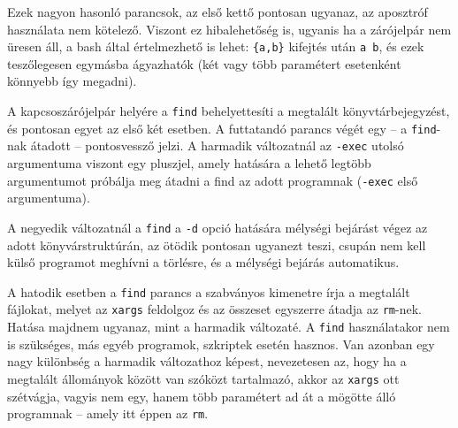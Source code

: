 Ezek nagyon hasonló parancsok, az első kettő pontosan ugyanaz, az aposztróf
használata nem kötelező. Viszont ez hibalehetőség is, ugyanis ha a zárójelpár
nem üresen áll, a bash által értelmezhető is lehet: \texttt{\{a,b\}} kifejtés
után \texttt{a b}, és ezek teszőlegesen egymásba ágyazhatók (két vagy több
paramétert esetenként könnyebb így megadni).

A kapcsoszárójelpár helyére a \texttt{find} behelyettesíti a megtalált
könyvtárbejegyzést, és pontosan egyet az első két esetben. A futtatandó parancs
végét egy -- a \texttt{find}-nak átadott -- pontosvessző jelzi. A harmadik
változatnál az \texttt{-exec} utolsó argumentuma viszont egy pluszjel, amely
hatására a lehető legtöbb argumentumot próbálja meg átadni a find az adott
programnak (\texttt{-exec} első argumentuma).

A negyedik változatnál a \texttt{find} a \texttt{-d} opció hatására mélységi
bejárást végez az adott könyvárstruktúrán, az ötödik pontosan ugyanezt teszi,
csupán nem kell külső programot meghívni a törlésre, és a mélységi bejárás
automatikus.

A hatodik esetben a \texttt{find} parancs a szabványos kimenetre írja a
megtalált fájlokat, melyet az \texttt{xargs} feldolgoz és az összeset egyszerre
átadja az \texttt{rm}-nek. Hatása majdnem ugyanaz, mint a harmadik változaté. A
\texttt{find} használatakor nem is szükséges, más egyéb programok, szkriptek
esetén hasznos. Van azonban egy nagy különbség a harmadik változathoz képest,
nevezetesen az, hogy ha a megtalált állományok között van szóközt tartalmazó,
akkor az \texttt{xargs} ott szétvágja, vagyis nem egy, hanem több paramétert ad
át a mögötte álló programnak -- amely itt éppen az \texttt{rm}.




